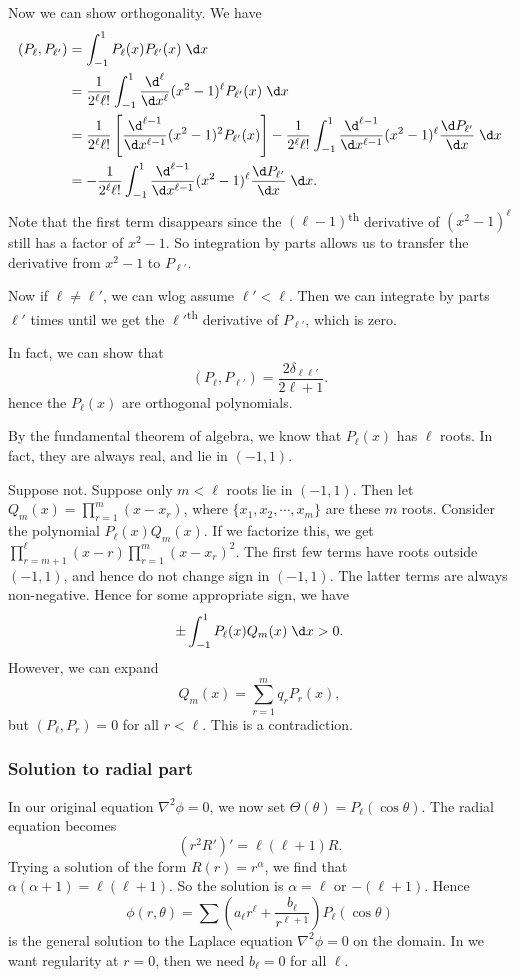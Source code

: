 \documentclass[a4paper]{article}
\begin{document}
Now we can show orthogonality. We have
\begin{align*}
  (P_\ell, P_{\ell'}) &= \int_{-1}^1 P_\ell(x) P_{\ell'}(x) \;\d x\\
  &= \frac{1}{2^\ell \ell!}\int_{-1}^1 \frac{\d^\ell}{\d x^\ell} (x^2 - 1)^\ell P_{\ell'}(x)\;\d x\\
  &= \frac{1}{2^\ell \ell!}\left[\frac{\d^{\ell - 1}}{\d x^{\ell - 1}} (x^2 - 1)^2 P_{\ell'}(x)\right] - \frac{1}{2^\ell \ell!} \int_{-1}^1 \frac{\d^{\ell - 1}}{\d x^{\ell - 1}}(x^2 - 1)^\ell \frac{\d P_{\ell'}}{\d x}\;\d x\\
  &= - \frac{1}{2^\ell \ell!} \int_{-1}^1 \frac{\d^{\ell - 1}}{\d x^{\ell - 1}}(x^2 - 1)^\ell \frac{\d P_{\ell'}}{\d x}\;\d x.
\end{align*}
Note that the first term disappears since the $(\ell - 1)$\textsuperscript{th} derivative of $(x^2 - 1)^\ell$ still has a factor of $x^2 - 1$. So integration by parts allows us to transfer the derivative from $x^2 - 1$ to $P_{\ell'}$.

Now if $\ell \not= \ell'$, we can wlog assume $\ell' < \ell$. Then we can integrate by parts $\ell'$ times until we get the $\ell'$\textsuperscript{th} derivative of $P_{\ell'}$, which is zero.

In fact, we can show that
\[
  (P_\ell, P_{\ell'}) = \frac{2\delta_{\ell\ell'}}{2\ell + 1}.
\]
hence the $P_\ell(x)$ are orthogonal polynomials.

By the fundamental theorem of algebra, we know that $P_\ell(x)$ has $\ell$ roots. In fact, they are always real, and lie in $(-1, 1)$.

Suppose not. Suppose only $m < \ell$ roots lie in $(-1, 1)$. Then let $Q_m(x) = \prod_{r = 1}^m (x - x_r)$, where $\{x_1, x_2, \cdots, x_m\}$ are these $m$ roots. Consider the polynomial $P_{\ell}(x)Q_m(x)$. If we factorize this, we get $\prod_{r = m + 1}^\ell (x - r)\prod_{r = 1}^m (x - x_r)^2$. The first few terms have roots outside $(-1, 1)$, and hence do not change sign in $(-1, 1)$. The latter terms are always non-negative. Hence for some appropriate sign, we have
\[
  \pm\int_{-1}^1 P_\ell(x) Q_m(x) \;\d x > 0.
\]
However, we can expand
\[
  Q_m(x) = \sum_{r = 1}^m q_r P_r(x),
\]
but $(P_\ell, P_r) = 0$ for all $r < \ell$. This is a contradiction.

\subsubsection{Solution to radial part}
In our original equation $\nabla^2 \phi = 0$, we now set $\Theta(\theta) = P_\ell(\cos \theta)$. The radial equation becomes
\[
  (r^2 R')' = \ell(\ell + 1)R.
\]
Trying a solution of the form $R(r) = r^\alpha$, we find that $\alpha(\alpha + 1) = \ell(\ell + 1)$. So the solution is $\alpha = \ell$ or $-(\ell + 1)$. Hence
\[
  \phi(r, \theta) = \sum \left(a_\ell r^\ell + \frac{b_\ell}{r^{\ell + 1}}\right) P_\ell(\cos \theta)
\]
is the general solution to the Laplace equation $\nabla^2 \phi = 0$ on the domain. In we want regularity at $r = 0$, then we need $b_\ell = 0$ for all $\ell$.
\end{document}
